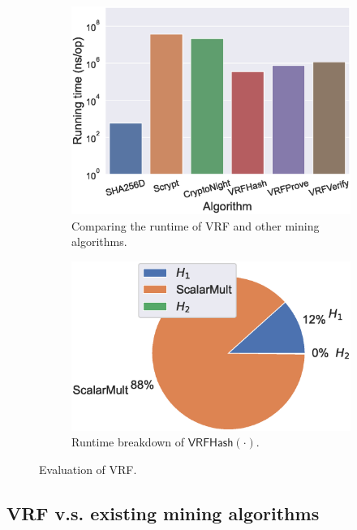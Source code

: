 \begin{figure}[htbp]
    \centering
    \begin{subfigure}[]{0.45\textwidth}
        \centering
        \includegraphics[width=\linewidth]{figs/runtime-comparison.eps}
        \caption{Comparing the runtime of VRF and other mining algorithms.}
        \label{fig:runtime-comparison}
    \end{subfigure}
    \hfill
    \begin{subfigure}[]{0.45\textwidth}
        \centering
        \includegraphics[width=\linewidth]{figs/runtime-breakdown.eps}
        \caption{Runtime breakdown of $\mathsf{VRFHash}(\cdot)$.}
        \label{fig:runtime-breakdown}
    \end{subfigure}
    \caption{Evaluation of VRF.}
\end{figure}

\subsection{VRF v.s. existing mining algorithms}

